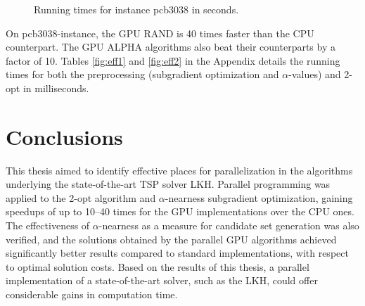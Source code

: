 \documentclass[english, 12pt, a4paper, sci, utf8, a-1b, online]{aaltothesis}
\begin{document}
\begin{figure}[H]
 \caption{Running times for instance pcb3038 in seconds.}
  \label{fig:effbar}
\end{figure}

On pcb3038-instance, the GPU RAND is 40 times faster than the CPU counterpart. The GPU ALPHA algorithms also beat their counterparts by a factor of 10. Tables \ref{fig:eff1} and \ref{fig:eff2} in the Appendix details the running times for both the preprocessing (subgradient optimization and $\alpha$-values) and 2-opt in milliseconds.

\section{Conclusions} \label{section:concl}
This thesis aimed to identify effective places for parallelization in the algorithms underlying the state-of-the-art TSP solver LKH. Parallel programming was applied to the 2-opt algorithm and $\alpha$-nearness subgradient optimization, gaining speedups of up to 10--40 times for the GPU implementations over the CPU ones. The effectiveness of $\alpha$-nearness as a measure for candidate set generation was also verified, and the solutions obtained by the parallel GPU algorithms achieved significantly better results compared to standard implementations, with respect to optimal solution costs. Based on the results of this thesis, a parallel implementation of a state-of-the-art solver, such as the LKH, could offer considerable gains in computation time.
\end{document}
